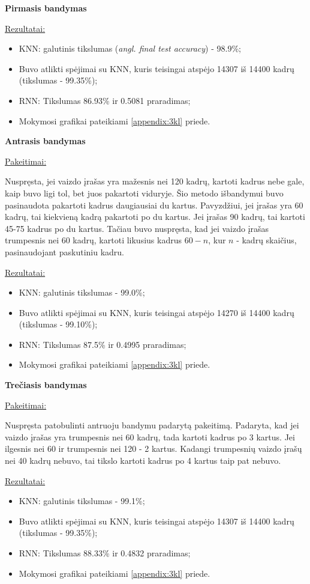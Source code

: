 \documentclass{VUMIFPSbakalaurinis}
\begin{document}
\bigbreak
\textbf{Pirmasis bandymas}

\underline{Rezultatai:}
\begin{itemize}
	\item KNN: galutinis tikslumas (\textit{angl. final test accuracy}) - 98.9\%;
	\item Buvo atlikti spėjimai su KNN, kuris teisingai atspėjo 14307 iš 14400 kadrų (tikslumas - 99.35\%);
	\item RNN: Tikslumas 86.93\% ir 0.5081 praradimas;
	\item Mokymosi grafikai pateikiami \ref{appendix:3kl} priede.
\end{itemize}

\bigbreak
\textbf{Antrasis bandymas}

\underline{Pakeitimai:}

Nuspręsta, jei vaizdo įrašas yra mažesnis nei 120 kadrų, kartoti kadrus nebe gale, kaip buvo ligi tol, bet juos pakartoti viduryje. Šio metodo išbandymui buvo pasinaudota pakartoti kadrus daugiausiai du kartus. Pavyzdžiui, jei įrašas yra 60 kadrų, tai kiekvieną kadrą pakartoti po du kartus. Jei įrašas 90 kadrų, tai kartoti 45-75 kadrus po du kartus. Tačiau buvo nuspręsta, kad jei vaizdo įrašas trumpesnis nei 60 kadrų, kartoti likusius kadrus $60-n$, kur $n$ - kadrų skaičius, pasinaudojant paskutiniu kadru.

\underline{Rezultatai:}
\begin{itemize}
	\item KNN: galutinis tikslumas - 99.0\%;
	\item Buvo atlikti spėjimai su KNN, kuris teisingai atspėjo 14270 iš 14400 kadrų (tikslumas - 99.10\%);
	\item RNN: Tikslumas 87.5\% ir 0.4995 praradimas;
	\item Mokymosi grafikai pateikiami \ref{appendix:3kl} priede.
\end{itemize}

\bigbreak
\textbf{Trečiasis bandymas}

\underline{Pakeitimai:}

Nuspręsta patobulinti antruoju bandymu padarytą pakeitimą. Padaryta, kad jei vaizdo įrašas yra trumpesnis nei 60 kadrų, tada kartoti kadrus po 3 kartus. Jei ilgesnis nei 60 ir trumpesnis nei 120 - 2 kartus. Kadangi trumpesnių vaizdo įrašų nei 40 kadrų nebuvo, tai tikslo kartoti kadrus po 4 kartus taip pat nebuvo.

\underline{Rezultatai:}
\begin{itemize}
	\item KNN: galutinis tikslumas - 99.1\%;
	\item Buvo atlikti spėjimai su KNN, kuris teisingai atspėjo 14307 iš 14400 kadrų (tikslumas - 99.35\%);
	\item RNN: Tikslumas 88.33\% ir 0.4832 praradimas;
	\item Mokymosi grafikai pateikiami \ref{appendix:3kl} priede.
\end{itemize}
\end{document}
